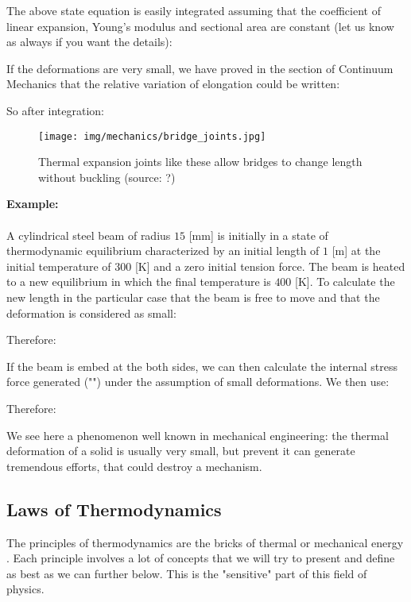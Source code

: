 	The above state equation is easily integrated assuming that the coefficient of linear expansion, Young's modulus and sectional area are constant (let us know as always if you want the details):
	
	If the deformations are very small, we have proved in the section of Continuum Mechanics that the relative variation of elongation could be written:
	
	
	So after integration:
	
	\begin{figure}[H]
		\centering
		\texttt{[image: img/mechanics/bridge\_joints.jpg]}
		\caption{Thermal expansion joints like these allow bridges to
change length without buckling (source: ?)}
	\end{figure}
	\begin{tcolorbox}[colframe=black,colback=white,sharp corners]
	\textbf{{\Large {}}Example:}\\\\
	A cylindrical steel beam of radius $15$ [mm] is initially in a state of thermodynamic equilibrium characterized by an initial length of $1$ [m] at the initial temperature of $300$ [K] and a zero initial tension force. The beam is heated to a new equilibrium in which the final temperature is $400$ [K]. To calculate the new length in the particular case that the beam is free to move and that the deformation is considered as small:
	
	Therefore:
	
	If the beam is embed at the both sides, we can then calculate the internal stress force generated ("") under the assumption of small deformations. We then use:
	
	Therefore:
	
	We see here a phenomenon well known in mechanical engineering: the thermal deformation of a solid is usually very small, but prevent it can generate tremendous efforts, that could destroy a mechanism.
	\end{tcolorbox}
	
	\pagebreak
	\subsection{Laws of Thermodynamics}
	The principles of thermodynamics are the bricks of thermal or mechanical energy . Each principle involves a lot of concepts that we will try to present and define as best as we can further below. This is the "sensitive" part of this field of physics.
	
